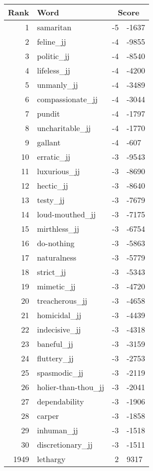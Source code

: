 \begin{longtable}[!htbp]{| rlr@{.}l |}
    \hline
    \textbf{Rank} & \textbf{Word} & \multicolumn{2}{c|}{\textbf{Score}} \\
    \hline
    \endhead
    1 & samaritan & -5 & -1637 \\
    2 & feline\_jj & -4 & -9855 \\
    3 & politic\_jj & -4 & -8540 \\
    4 & lifeless\_jj & -4 & -4200 \\
    5 & unmanly\_jj & -4 & -3489 \\
    6 & compassionate\_jj & -4 & -3044 \\
    7 & pundit & -4 & -1797 \\
    8 & uncharitable\_jj & -4 & -1770 \\
    9 & gallant & -4 & -607 \\
    10 & erratic\_jj & -3 & -9543 \\
    11 & luxurious\_jj & -3 & -8690 \\
    12 & hectic\_jj & -3 & -8640 \\
    13 & testy\_jj & -3 & -7679 \\
    14 & loud-mouthed\_jj & -3 & -7175 \\
    15 & mirthless\_jj & -3 & -6754 \\
    16 & do-nothing & -3 & -5863 \\
    17 & naturalness & -3 & -5779 \\
    18 & strict\_jj & -3 & -5343 \\
    19 & mimetic\_jj & -3 & -4720 \\
    20 & treacherous\_jj & -3 & -4658 \\
    21 & homicidal\_jj & -3 & -4439 \\
    22 & indecisive\_jj & -3 & -4318 \\
    23 & baneful\_jj & -3 & -3159 \\
    24 & fluttery\_jj & -3 & -2753 \\
    25 & spasmodic\_jj & -3 & -2119 \\
    26 & holier-than-thou\_jj & -3 & -2041 \\
    27 & dependability & -3 & -1906 \\
    28 & carper & -3 & -1858 \\
    29 & inhuman\_jj & -3 & -1518 \\
    30 & discretionary\_jj & -3 & -1511 \\
    1949 & lethargy & 2 & 9317 \\

\end{longtable}
